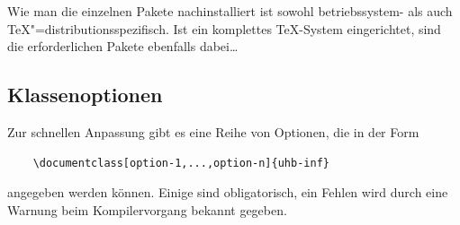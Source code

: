 \documentclass[nicefonts,nogruppe,nosemester,noveranstaltung,notutor,noabgabe,utf]{uhb-inf}
\begin{document}
Wie man die einzelnen Pakete nachinstalliert ist sowohl betriebssystem- als auch \TeX"=distributionsspezifisch. Ist ein komplettes \TeX-System eingerichtet, sind die erforderlichen Pakete ebenfalls dabei\dots

\subsection{Klassenoptionen}

Zur schnellen Anpassung gibt es eine Reihe von Optionen, die in der Form

\begin{verbatim}
    \documentclass[option-1,...,option-n]{uhb-inf}
\end{verbatim}

angegeben werden können. Einige sind obligatorisch, ein Fehlen wird durch eine Warnung beim Kompilervorgang bekannt gegeben.
\end{document}
